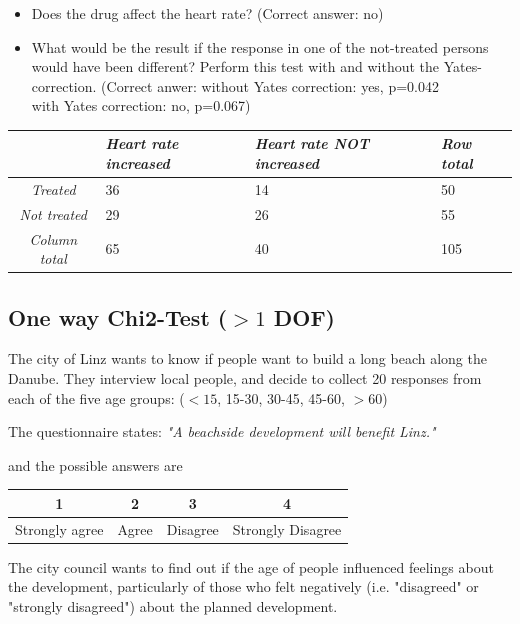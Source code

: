 \begin{itemize}
  \item     Does the drug affect the heart rate?
    (Correct answer: no)

  \item     What would be the result if the response in one of the not-treated persons would have been different? Perform this test with and without the Yates-correction.
      (Correct anwer:
        without Yates correction: yes, p=0.042\\
        with Yates correction: no, p=0.067)

\end{itemize}

\begin{table}[h]
  \centering
  \begin{tabular}{|c|l l | l|}
  \hline
  & \emph{Heart rate increased} & \emph{Heart rate NOT increased} & \emph{Row total} \\
  \hline
  \emph{Treated} & 36 & 14 & 50 \\
  \emph{Not treated} & 29 & 26 & 55 \\
  \hline
  \emph{Column total} & 65 & 40 & 105 \\
  \hline
  \end{tabular}
\end{table}


\subsection*{One way Chi2-Test ($>1$ DOF)}

The city of Linz wants to know if people want to build a long beach along the Danube. They interview local people, and decide to collect 20 responses from each of the five age groups: ($<15$, 15-30, 30-45, 45-60, $>60$)

The questionnaire states: \emph{"A beachside development will benefit Linz."}

and the possible answers are

\begin{table}[h]
    \centering
    \begin{tabular}{c|c|c|c}
      1 & 2 & 3 & 4 \\
      \hline
      Strongly agree & Agree & Disagree & Strongly Disagree \\
    \end{tabular}
\end{table}

The city council wants to find out if the age of people influenced feelings about the development, particularly of those who felt negatively (i.e. "disagreed" or "strongly disagreed") about the planned development.

